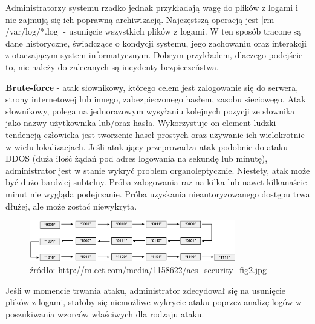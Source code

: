         Administratorzy systemu rzadko jednak przykładają wagę do plików z logami i nie zajmują się ich poprawną archiwizacją.
        Najczęstszą operacją jest |rm /var/log/*.log| - usunięcie wszystkich plików z logami. W ten sposób
        tracone są dane historyczne, świadczące o kondycji systemu, jego zachowaniu oraz interakcji z otaczającym system informatycznym.
        Dobrym przykładem, dlaczego podejście to, nie należy do zalecanych są incydenty bezpieczeństwa. 
        
        \textbf{Brute-force}\cite{brute_force_attack} - atak słownikowy, którego celem jest zalogowanie się do serwera, strony internetowej lub innego, zabezpieczonego
        hasłem, zasobu sieciowego. Atak słownikowy, polega na jednorazowym wysyłaniu kolejnych pozycji ze słownika jako nazwy użytkownika lub/oraz
        hasła. Wykorzystuje on element ludzki - tendencją człowieka jest tworzenie haseł prostych oraz używanie ich wielokrotnie w wielu
        lokalizacjach. Jeśli atakujący przeprowadza atak podobnie do ataku DDOS (duża ilość żądań pod adres logowania na sekundę lub minutę),
        administrator jest w stanie wykryć problem organoleptycznie. Niestety, atak może być dużo bardziej subtelny. Próba zalogowania raz
        na kilka lub nawet kilkanaście minut nie wygląda podejrzanie. Próba uzyskania nieautoryzowanego dostępu trwa dłużej, ale może zostać niewykryta.
        
        \begin{figure}[H]
          \centering
          \includegraphics[width=0.80\textwidth]{images/brute_force}
          \caption[Schemat ataku brute-force]{
              źródło: \url{http://m.eet.com/media/1158622/aes_security_fig2.jpg}
            }
            \label{chapter:logs:collecting:brute_force}
        \end{figure}
        
        Jeśli w momencie trwania ataku, administrator zdecydował się na usunięcie plików z logami, stałoby się niemożliwe wykrycie ataku poprzez analizę logów w poszukiwania wzorców właściwych dla rodzaju ataku.
        
